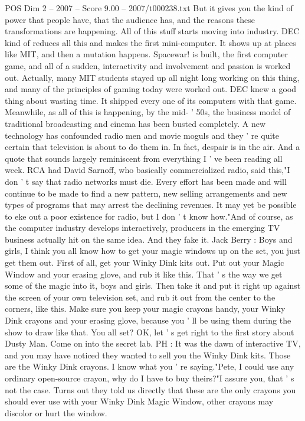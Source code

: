 \begin{textsample}{POS Dim 2 – 2007 – Score 9.00 – 2007/t000238.txt}
But it gives you the kind of power that people have, that the audience has, and the reasons these transformations are happening.
All of this stuff starts moving into industry.
DEC kind of reduces all this and makes the first mini-computer.
It shows up at places like MIT, and then a mutation happens.
Spacewar! is built, the first computer game, and all of a sudden, interactivity and involvement and passion is worked out.
Actually, many MIT students stayed up all night long working on this thing, and many of the principles of gaming today were worked out.
DEC knew a good thing about wasting time.
It shipped every one of its computers with that game.
Meanwhile, as all of this is happening, by the mid- ' 50s, the business model of traditional broadcasting and cinema has been busted completely.
A new technology has confounded radio men and movie moguls and they ' re quite certain that television is about to do them in.
In fact, despair is in the air.
And a quote that sounds largely reminiscent from everything I ' ve been reading all week.
RCA had David Sarnoff, who basically commercialized radio, said this,"I don ' t say that radio networks must die.
Every effort has been made and will continue to be made to find a new pattern, new selling arrangements and new types of programs that may arrest the declining revenues.
It may yet be possible to eke out a poor existence for radio, but I don ' t know how."And of course, as the computer industry develops interactively, producers in the emerging TV business actually hit on the same idea.
And they fake it.
Jack Berry : Boys and girls, I think you all know how to get your magic windows up on the set, you just get them out.
First of all, get your Winky Dink kits out.
Put out your Magic Window and your erasing glove, and rub it like this.
That ' s the way we get some of the magic into it, boys and girls.
Then take it and put it right up against the screen of your own television set, and rub it out from the center to the corners, like this.
Make sure you keep your magic crayons handy, your Winky Dink crayons and your erasing glove, because you ' ll be using them during the show to draw like that.
You all set?
OK, let ' s get right to the first story about Dusty Man.
Come on into the secret lab.
PH : It was the dawn of interactive TV, and you may have noticed they wanted to sell you the Winky Dink kits.
Those are the Winky Dink crayons.
I know what you ' re saying."Pete, I could use any ordinary open-source crayon, why do I have to buy theirs?"I assure you, that ' s not the case.
Turns out they told us directly that these are the only crayons you should ever use with your Winky Dink Magic Window, other crayons may discolor or hurt the window.

\end{textsample}
